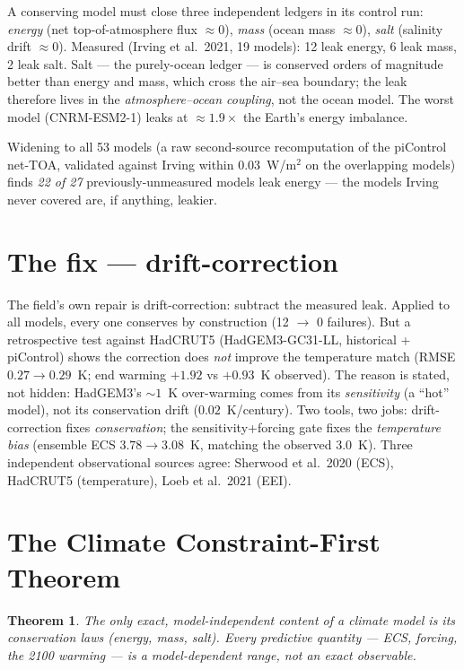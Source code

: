 \documentclass[11pt]{article}
\newtheorem{theorem}{Theorem}
\begin{document}
A conserving model must close three independent ledgers in its control run:
\emph{energy} (net top-of-atmosphere flux $\approx 0$), \emph{mass} (ocean mass
$\approx 0$), \emph{salt} (salinity drift $\approx 0$). Measured (Irving et
al.~2021, 19 models): 12 leak energy, 6 leak mass, 2 leak salt. Salt --- the
purely-ocean ledger --- is conserved orders of magnitude better than energy and
mass, which cross the air--sea boundary; the leak therefore lives in the
\emph{atmosphere--ocean coupling}, not the ocean model. The worst model
(CNRM-ESM2-1) leaks at $\approx 1.9\times$ the Earth's energy imbalance.

Widening to all 53 models (a raw second-source recomputation of the piControl
net-TOA, validated against Irving within $0.03$~W/m$^2$ on the overlapping models)
finds \emph{22 of 27} previously-unmeasured models leak energy --- the models
Irving never covered are, if anything, leakier.

\section{The fix --- drift-correction}

The field's own repair is drift-correction: subtract the measured leak. Applied to
all models, every one conserves by construction (12 $\to$ 0 failures). But a
retrospective test against HadCRUT5 (HadGEM3-GC31-LL, historical + piControl)
shows the correction does \emph{not} improve the temperature match (RMSE
$0.27 \to 0.29$~K; end warming $+1.92$ vs $+0.93$~K observed). The reason is
stated, not hidden: HadGEM3's $\sim 1$~K over-warming comes from its
\emph{sensitivity} (a ``hot'' model), not its conservation drift
($0.02$~K/century). Two tools, two jobs: drift-correction fixes
\emph{conservation}; the sensitivity+forcing gate fixes the \emph{temperature
bias} (ensemble ECS $3.78 \to 3.08$~K, matching the observed $3.0$~K). Three
independent observational sources agree: Sherwood et al.~2020 (ECS), HadCRUT5
(temperature), Loeb et al.~2021 (EEI).

\section{The Climate Constraint-First Theorem}

\begin{theorem}
The only exact, model-independent content of a climate model is its conservation
laws (energy, mass, salt). Every predictive quantity --- ECS, forcing, the 2100
warming --- is a model-dependent range, not an exact observable.
\end{theorem}
\end{document}
